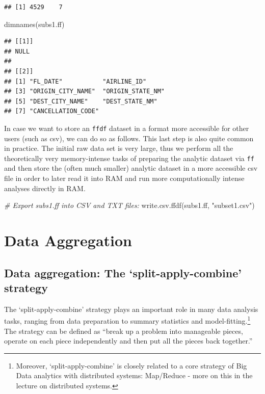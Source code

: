 \documentclass[
  12pt,
]{style/krantz}
\newenvironment{Shaded}{\begin{snugshade}}{\end{snugshade}}
\newcommand{\CommentTok}[1]{\textcolor[rgb]{0.56,0.35,0.01}{\textit{#1}}}
\newcommand{\FunctionTok}[1]{\textcolor[rgb]{0.00,0.00,0.00}{#1}}
\newcommand{\NormalTok}[1]{#1}
\newcommand{\StringTok}[1]{\textcolor[rgb]{0.31,0.60,0.02}{#1}}
\begin{document}
\begin{verbatim}
## [1] 4529    7
\end{verbatim}

\begin{Shaded}
\begin{Highlighting}[]
\FunctionTok{dimnames}\NormalTok{(subs1.ff)}
\end{Highlighting}
\end{Shaded}

\begin{verbatim}
## [[1]]
## NULL
## 
## [[2]]
## [1] "FL_DATE"           "AIRLINE_ID"       
## [3] "ORIGIN_CITY_NAME"  "ORIGIN_STATE_NM"  
## [5] "DEST_CITY_NAME"    "DEST_STATE_NM"    
## [7] "CANCELLATION_CODE"
\end{verbatim}

In case we want to store an \texttt{ffdf} dataset in a format more accessible for other users (such as csv), we can do so as follows. This last step is also quite common in practice. The initial raw data set is very large, thus we perform all the theoretically very memory-intense tasks of preparing the analytic dataset via \texttt{ff} and then store the (often much smaller) analytic dataset in a more accessible csv file in order to later read it into RAM and run more computationally intense analyses directly in RAM.

\begin{Shaded}
\begin{Highlighting}[]
\CommentTok{\#  Export subs1.ff into CSV and TXT files:}
\FunctionTok{write.csv.ffdf}\NormalTok{(subs1.ff, }\StringTok{"subset1.csv"}\NormalTok{)}
\end{Highlighting}
\end{Shaded}

\hypertarget{data-aggregation}{%
\chapter{Data Aggregation}\label{data-aggregation}}

\hypertarget{data-aggregation-the-split-apply-combine-strategy}{%
\section{Data aggregation: The `split-apply-combine' strategy}\label{data-aggregation-the-split-apply-combine-strategy}}

The `split-apply-combine' strategy plays an important role in many data analysis tasks, ranging from data preparation to summary statistics and model-fitting.\footnote{Moreover, `split-apply-combine' is closely related to a core strategy of Big Data analytics with distributed systems: Map/Reduce - more on this in the lecture on distributed systems.} The strategy can be defined as ``break up a problem into manageable pieces, operate on each piece independently and then put all the pieces back together.'' \citep[p.~1]{wickham_2011}
\end{document}
